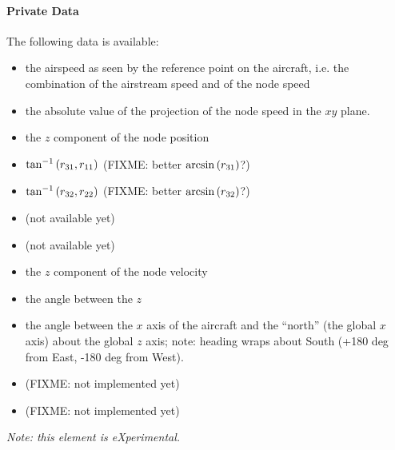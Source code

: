 \paragraph{Private Data}
The following data is available:
\begin{itemize}
\item {} the airspeed as seen by the reference 
	point on the aircraft, i.e. the combination 
	of the airstream speed and of the node speed
\item {} the absolute value of the projection
	of the node speed in the $xy$ plane.
\item {} the $z$ component of the node position
\item {} $\tan^{-1}\left( r_{31}, r_{11} \right)$
	(FIXME: better $\arcsin\left( r_{31} \right)$?)
\item {} $\tan^{-1}\left( r_{32}, r_{22} \right)$
	(FIXME: better $\arcsin\left( r_{32} \right)$?)
\item {} (not available yet)
\item {} (not available yet)
\item {} the $z$ component of the node velocity
\item {} the angle between the $z$ 
\item {} the angle between the $x$ axis of the aircraft 
	and the ``north'' (the global $x$ axis) about the global $z$ axis;
	note: heading wraps about South
	(+180 deg from East, -180 deg from West).
\item {} (FIXME: not implemented yet)
\item {} (FIXME: not implemented yet)
\end{itemize}

\noindent
\emph{Note: this element is eXperimental.}




